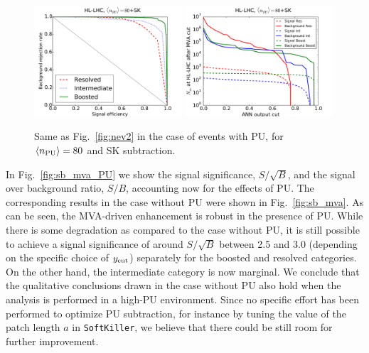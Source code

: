 \begin{figure}[t]
  \begin{center}
    \includegraphics[width=0.49\textwidth]{plots/roc_SKPU80.pdf}
\includegraphics[width=0.49\textwidth]{plots/nev2_SKPU80.pdf}
\caption{\small Same as Fig.~\ref{fig:nev2} in the
case of events with PU, for
 $\left\langle n_{\rm PU}\right\rangle=80$ 
  and SK subtraction.
}
\label{fig:nev2_PU}
\end{center}
\end{figure}


In Fig.~\ref{fig:sb_mva_PU} we show the signal significance,
$S/\sqrt{B}$, and the signal over background ratio,
$S/B$, accounting now for the effects of PU.
%
The corresponding results in the case without PU were shown in
Fig.~\ref{fig:sb_mva}.
%
As can be seen, the MVA-driven enhancement is robust in the
presence of PU.
%
While
there is some degradation as compared to the case
without PU,
it is still possible to
achieve a signal significance of
around $S/\sqrt{B}$ between 2.5 and 3.0 (depending on the
specific choice of $y_{\rm cut}$)
separately for the boosted and resolved
categories.
%
On the other hand, the intermediate category is now marginal.
%
We conclude that the qualitative conclusions drawn
in the case without PU also hold when the analysis
is performed in a high-PU environment.
%
Since no specific effort has been performed to
optimize PU subtraction, for instance by tuning the value
of the patch length $a$ in {\tt SoftKiller}, we believe that
there could be still room for further  improvement.


